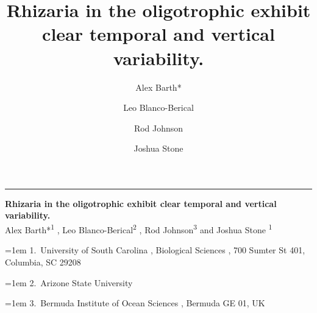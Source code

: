 \documentclass[
]{article}
\title{Rhizaria in the oligotrophic exhibit clear temporal and vertical
variability.}
\author{Alex Barth* \and Leo Blanco-Berical \and Rod Johnson \and Joshua
Stone}
\date{}
\begin{document}
    \begin{titlepage}

\raggedleft %
\rule{1pt}{\textheight} %
\hspace{0.05\textwidth} %
\begin{minipage}[b][\textheight][s]{0.85\textwidth}

\raggedright
{\large\bfseries\nohyphens{Rhizaria in the oligotrophic exhibit clear
temporal and vertical variability.}}\\[2\baselineskip] 

  
 {\large{Alex Barth*}}{\textsuperscript{1}}%
%
, 
 {\large{Leo Blanco-Berical}}{\textsuperscript{2}}%
%
, 
 {\large{Rod Johnson}}{\textsuperscript{3}}%
%
%
{ and \large{Joshua Stone}}%
{\textsuperscript{1}}%
%



  
\vspace{2\baselineskip} 

\hangindent=1em
%
{1}.~{University of South Carolina}%
%
, %
{Biological Sciences}%
%
%
, %
{700 Sumter St 401, Columbia, SC 29208}%
%
\par\hangindent=1em%
%
{2}.~{Arizone State University}%
%
%
\par\hangindent=1em%
%
{3}.~{Bermuda Institute of Ocean Sciences}%
%
%
, %
{Bermuda GE 01, UK}%
%

  
\vspace{1\baselineskip} 

                  

\vfill


  
\vspace{0.1\textheight} 

\end{minipage}  \end{titlepage}
\ifdefined\Shaded\renewenvironment{Shaded}{\begin{tcolorbox}[boxrule=0pt, frame hidden, sharp corners, borderline west={3pt}{0pt}{shadecolor}, enhanced, breakable, interior hidden]}{\end{tcolorbox}}\fi
\end{document}
